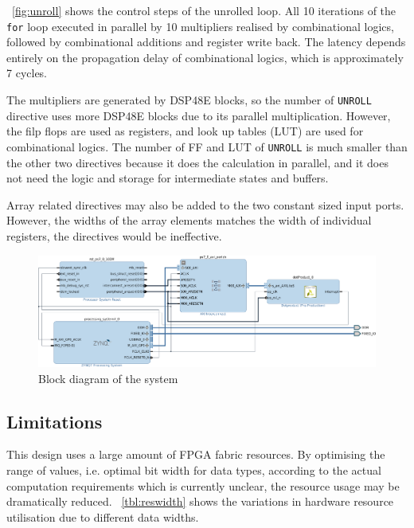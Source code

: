 \documentclass[journal]{IEEEtran}
\newcommand{\fref}[1]{\figurename~\ref{#1}}
\newcommand{\tref}[1]{\tablename~\ref{#1}}
\begin{document}
\fref{fig:unroll} shows the control steps of the unrolled loop. All 10 iterations of the \texttt{for} loop executed in parallel by 10 multipliers realised by combinational logics, followed by combinational additions and register write back. The latency depends entirely on the propagation delay of combinational logics, which is approximately 7 cycles.

The multipliers are generated by DSP48E blocks, so the number of \texttt{UNROLL} directive uses more DSP48E blocks due to its parallel multiplication. However, the filp flops are used as registers, and look up tables (LUT) are used for combinational logics. The number of FF and LUT of \texttt{UNROLL} is much smaller than the other two directives because it does the calculation in parallel, and it does not need the logic and storage for intermediate states and buffers. 

Array related directives may also be added to the two constant sized input ports. However, the widths of the array elements matches the width of individual registers, the directives would be ineffective. 

\begin{figure}[!t]
	\centering
	\includegraphics[width=\textwidth]{block}
	\caption{Block diagram of the system}
	\label{fig:block}
\end{figure}

\subsection{Limitations}

This design uses a large amount of FPGA fabric resources. By optimising the range of values, i.e. optimal bit width for data types, according to the actual computation requirements which is currently unclear, the resource usage may be dramatically reduced. \tref{tbl:reswidth} shows the variations in hardware resource utilisation due to different data widths.
\end{document}
